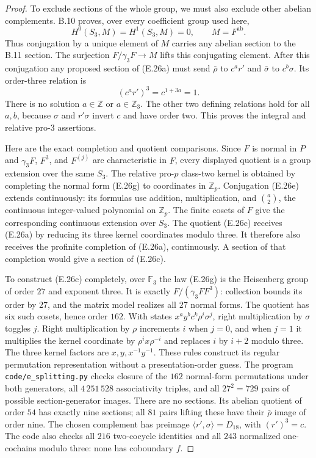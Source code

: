 \begin{proof}
To exclude sections of the whole group, we must also exclude
other abelian complements. B.10 proves, over every coefficient
group used here,
\[
 H^0(S_3,M)=H^1(S_3,M)=0,
 \qquad M=F^{\mathrm{ab}}.
\]
Thus conjugation by a unique element of $M$ carries any abelian
section to the B.11 section. The surjection
$F/\gamma_3F\to M$ lifts this conjugating element.
After this conjugation any proposed section of (E.26a) must send
$\bar\rho$ to $c^a r'$ and $\bar\sigma$ to $c^b\sigma$.
Its order-three relation is
\[
 (c^a r')^3=c^{1+3a}=1.                                    \tag{E.26i}
\]
There is no solution $a\in\mathbb Z$ or $a\in\mathbb Z_3$.
The other two defining relations hold for all $a,b$, because
$\sigma$ and $r'\sigma$ invert $c$ and have order two.
This proves the integral and relative pro-$3$ assertions.

Here are the exact completion and quotient comparisons. Since
$F$ is normal in $P$ and $\gamma_3F$, $F^3$, and $F^{(j)}$ are
characteristic in $F$, every displayed quotient is a group
extension over the same $S_3$. The relative pro-$p$ class-two
kernel is obtained by completing the normal form (E.26g) to
coordinates in $\mathbb Z_p$. Conjugation (E.26e) extends
continuously: its formulas use addition, multiplication, and
$\binom a2$, the continuous integer-valued polynomial on
$\mathbb Z_p$. The finite cosets of $F$ give the corresponding
continuous extension over $S_3$.
The quotient (E.26c) receives (E.26a) by reducing its three
kernel coordinates modulo three. It therefore also receives
the profinite completion of (E.26a), continuously. A section
of that completion would give a section of (E.26c).

To construct (E.26c) completely, over $\mathbb F_3$ the law
(E.26g) is the Heisenberg group of order $27$ and exponent
three. It is exactly $F/(\gamma_3F F^3)$: collection bounds
its order by $27$, and the matrix model realizes all $27$
normal forms. The quotient has six such cosets, hence order
$162$. With states $x^a y^b c^k\rho^i\sigma^j$, right
multiplication by $\sigma$ toggles $j$. Right multiplication
by $\rho$ increments $i$ when $j=0$, and when $j=1$ it
multiplies the kernel coordinate by $\rho^i x\rho^{-i}$ and
replaces $i$ by $i+2$ modulo three. The three kernel factors are
$x,y,x^{-1}y^{-1}$. These rules construct its regular
permutation representation without a presentation-order guess.
The program \texttt{code/e\_splitting.py} checks closure of the
$162$ normal-form permutations under both generators, all
$4\,251\,528$ associativity triples, and all $27^2=729$
pairs of possible section-generator images. There are no
sections. Its abelian quotient of order $54$ has exactly nine
sections; all $81$ pairs lifting these have their
$\bar\rho$ image of order nine. The chosen complement has
preimage $\langle r',\sigma\rangle=D_{18}$, with
$(r')^3=c$. The code also checks all $216$ two-cocycle
identities and all $243$ normalized one-cochains modulo three:
none has coboundary $f$.


\end{proof}
